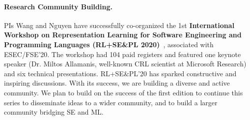 \paragraph{Research Community Building.}

PIs Wang and Nguyen have successfully co-organized the 1st {\bf
International Workshop on Representation Learning for Software
Engineering and Programming Languages (RL+SE\&PL 2020)}~\cite{rlsepl},
associated with ESEC/FSE'20. The workshop had 104 paid registers and
featured one keynote speaker (Dr. Miltos Allamanis, well-known CRL
scientist at Microsoft Research) and six technical
presentations. RL+SE\&PL'20 has sparked constructive and inspiring
discussions. With its success, we are building a diverse and active
community. We plan to build on the success of the first edition to
continue this series to disseminate ideas to a wider community, and to
build a larger community bridging SE and ML.
